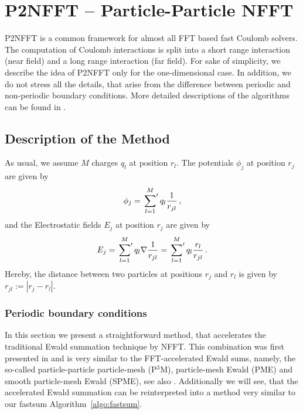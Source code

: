 \chapter{P2NFFT -- Particle-Particle NFFT}
\label{cha:p2nfft}


\def\alp{13}




P2NFFT is a common framework for almost all FFT based fast Coulomb solvers.
The computation of Coulomb interactions is split into a short range interaction (near field) and
a long range interaction (far field).
For sake of simplicity, we describe the idea of P2NFFT only for the one-dimensional case.
In addition, we do not stress all the details, that arise from the difference between periodic and
non-periodic boundary conditions. More detailed descriptions of the algorithms can be found in \cite{PiPo10}.

\section{Description of the Method}

As usual, we assume $M$ charges $q_l$ at position $r_l$. The potentials $\phi_j$ at position $r_j$
are given by
\begin{equation*}
  \phi_j
  =
  \sideset{}{^\prime}\sum_{l=1}^M
    q_l\frac{1}{r_{jl}}
  \,,
\end{equation*}
and the Electrostatic fields $E_j$ at position $r_j$ are given by
\begin{equation*}
  E_j
  =
  \sideset{}{^\prime}\sum_{l=1}^M
    q_l\nabla\frac{1}{r_{jl}}
  =
  \sideset{}{^\prime}\sum_{l=1}^M
    q_l \frac{r_l}{r_{jl}}
  \,.
\end{equation*}
Hereby, the distance between two particles at positions $r_j$ and $r_l$ is given by $r_{jl}:=|r_j-r_l|$.

\subsection{Periodic boundary conditions}
In this section we present a straightforward method, that accelerates the traditional Ewald
summation technique by NFFT. This combination was first presented in \cite{HeLa06} and
is very similar to the FFT-accelerated Ewald sums, namely, the so-called
particle-particle particle-mesh (P$^3$M), particle-mesh Ewald (PME) and smooth particle-mesh
Ewald (SPME), see also \cite{DeHo98a}.
Additionally we will see, that the accelerated Ewald summation can be reinterpreted
into a method very similar to our fastsum Algorithm~\ref{algo:fastsum}.


